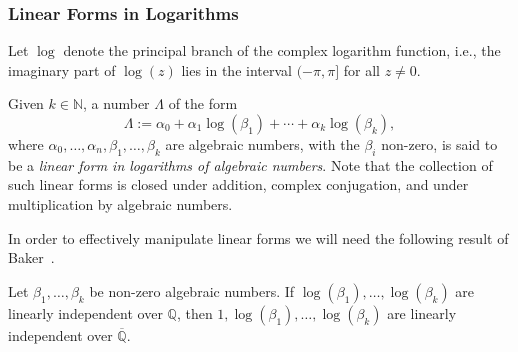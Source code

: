\documentclass[format=acmsmall, review=false, screen=true]{acmart}
\newcommand{\Rationals}{\mathbb{Q}}
\newcommand{\Algebraics}{\overline{\Rationals}}
\begin{document}
\subsubsection{Linear Forms in Logarithms}
Let $\log$ denote the principal branch of the complex logarithm
function, i.e., the imaginary part of $\log(z)$ lies in the interval
$(-\pi,\pi]$ for all $z\neq 0$.

Given $k\in\mathbb{N}$, a number $\Lambda$ of the form
\begin{equation}
\Lambda :=  \alpha_{0} + \alpha_{1} \log(\beta_{1}) + \cdots + \alpha_{k} \log(\beta_{k}),
\label{eq:linear-form}
\end{equation}
where $\alpha_{0}, \ldots, \alpha_{n}, \beta_{1}, \ldots, \beta_{k}$
are algebraic numbers, with the $\beta_i$ non-zero, is said to be
a \emph{linear form in logarithms of algebraic numbers}. Note that the
collection of such linear forms is closed under addition, complex
conjugation, and under multiplication by algebraic numbers.

In order to effectively manipulate linear forms we will need 
the following result of Baker~\cite{Baker75}.

\begin{theorem}[Baker]
\label{thm:Baker}
Let $\beta_{1}, \ldots, \beta_{k}$ be non-zero algebraic numbers. If
$\log(\beta_{1}), \ldots, \log(\beta_{k})$ 
are linearly independent over $\Rationals$, then
$1, \log(\beta_{1}), \ldots, \log(\beta_{k})$
are linearly independent over $\Algebraics$.
\end{theorem}
\end{document}
